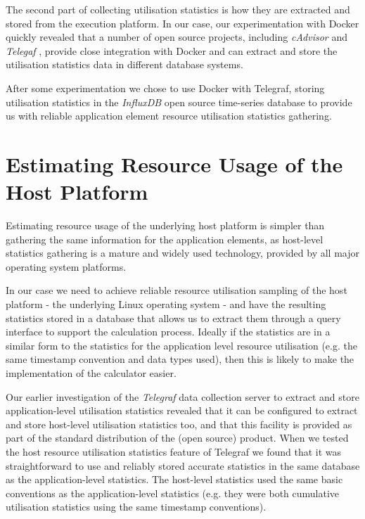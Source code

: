 The second part of collecting utilisation statistics is how they are extracted and stored from the execution platform.  In our case, our experimentation with Docker quickly revealed that a number of open source projects, including \emph{cAdvisor} \cite{cadvisor2018} and \emph{Telegaf} \cite{telegraf2018}, provide close integration with Docker and can extract and store the utilisation statistics data in different database systems.

After some experimentation we chose to use Docker with Telegraf, storing utilisation statistics in the \emph{InfluxDB} \cite{influxdb2018} open source time-series database to provide us with reliable application element resource utilisation statistics gathering.

\section{Estimating Resource Usage of the Host Platform}

Estimating resource usage of the underlying host platform is simpler than gathering the same information for the application elements, as host-level statistics gathering is a mature and widely used technology, provided by all major operating system platforms.

In our case we need to achieve reliable resource utilisation sampling of the host platform - the underlying Linux operating system - and have the resulting statistics stored in a database that allows us to extract them through a query interface to support the calculation process.  Ideally if the statistics are in a similar form to the statistics for the application level resource utilisation (e.g. the same timestamp convention and data types used), then this is likely to make the implementation of the calculator easier.

Our earlier investigation of the \emph{Telegraf} data collection server to extract and store application-level utilisation statistics revealed that it can be configured to extract and store host-level utilisation statistics too, and that this facility is provided as part of the standard distribution of the (open source) product.  When we tested the host resource utilisation statistics feature of Telegraf we found that it was straightforward to use and reliably stored accurate statistics in the same database as the application-level statistics.  The host-level statistics used the same basic conventions as the application-level statistics (e.g. they were both cumulative utilisation statistics using the same timestamp conventions).

